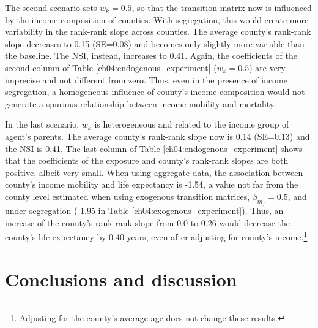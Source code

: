 \documentclass[class=article, crop=false, 12pt]{standalone}
\begin{document}
The second scenario sets $w_k=0.5$, so that the transition matrix now is influenced by the income composition of counties. With segregation, this would create more variability in the rank-rank slope across counties. The average county's rank-rank slope decreases to 0.15 (SE=0.08) and becomes only slightly more variable than the baseline. The NSI, instead, increases to 0.41. Again, the coefficients of the second column of Table \ref{ch04:endogenous_experiment} ($w_k=0.5$) are very imprecise and not different from zero. Thus, even in the presence of income segregation, a homogeneous influence of county's income composition would not generate a spurious relationship between income mobility and mortality. 

In the last scenario, $w_k$ is heterogeneous and related to the income group of agent's parents. The average county's rank-rank slope now is 0.14 (SE=0.13) and the NSI is 0.41. The last column of Table \ref{ch04:endogenous_experiment} shows that the coefficients of the exposure and county's rank-rank slopes are both positive, albeit very small. When using aggregate data, the association between county's income mobility and life expectancy is -1.54, a value not far from the county level estimated when using exogenous transition matrices, $\beta_{m_{f}} = 0.5$, and under segregation (-1.95 in  Table \ref{ch04:exogenous_experiment}). Thus, an increase of the county's rank-rank slope from 0.0 to 0.26 would decrease the county's life expectancy by 0.40 years, even after adjusting for county's income.\footnote{Adjusting for the county's average age does not change these results.} 

\section{Conclusions and discussion}

\end{document}
